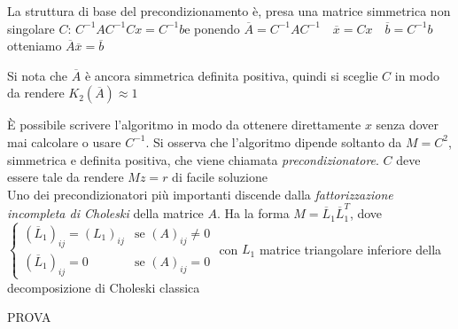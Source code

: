 \documentclass[openany]{book}
\begin{document}
La struttura di base del precondizionamento è, presa una matrice simmetrica non singolare $C$: $C^{-1}AC^{-1}Cx=C^{-1}b$\quad e ponendo $\overline{A}=C^{-1}AC^{-1} \quad \overline{x}=Cx \quad \overline{b}=C^{-1}b$\quad otteniamo $\overline{A}\overline{x}=\overline{b}$

Si nota che $\overline{A}$ è ancora simmetrica definita positiva, quindi si sceglie $C$ in modo da rendere $K_2(\overline{A})\approx 1$

È possibile scrivere l'algoritmo in modo da ottenere direttamente $x$ senza dover mai calcolare o usare $C^{-1}$. Si osserva che l'algoritmo dipende soltanto da $M=C^2$, simmetrica e definita positiva, che viene chiamata \textit{precondizionatore}. $C$ deve essere tale da rendere $Mz=r$ di facile soluzione 
\\

Uno dei precondizionatori più importanti discende dalla \textit{fattorizzazione incompleta di Choleski} della matrice $A$. Ha la forma $M=\overline{L}_1\overline{L}_1^T$, dove
$\left\{ \begin{array}{ll}(\overline{L}_1)_{ij}=(L_1)_{ij} & \text{se } (A)_{ij}\neq 0 \\ (\overline{L}_1)_{ij}=0 & \text{se } (A)_{ij}=0\end{array} \right.$ con $L_1$ matrice triangolare inferiore della decomposizione di Choleski classica

PROVA
\end{document}
